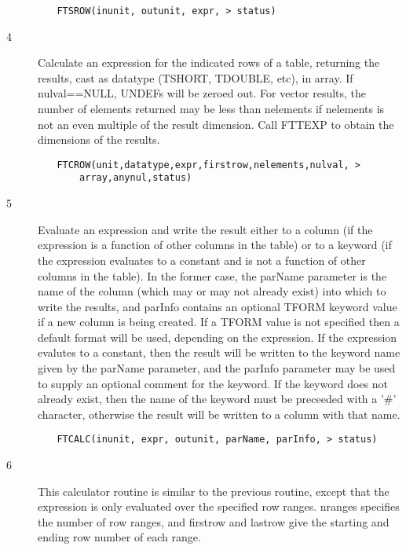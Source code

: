 \documentclass[11pt]{book}
\begin{document}
\begin{verbatim}
         FTSROW(inunit, outunit, expr, > status)
\end{verbatim}

\begin{description}
\item[4 ] Calculate an expression for the indicated rows of a table, returning
the results, cast as datatype (TSHORT, TDOUBLE, etc), in array.  If
nulval==NULL, UNDEFs will be zeroed out.  For vector results, the number
of elements returned may be less than nelements if nelements is not an
even multiple of the result dimension.  Call FTTEXP to obtain
the dimensions of the results.
\end{description}

\begin{verbatim}
         FTCROW(unit,datatype,expr,firstrow,nelements,nulval, >
             array,anynul,status)
\end{verbatim}

\begin{description}
\item[5 ]Evaluate an expression and write the result either to a column (if
the expression is a function of other columns in the table) or to a
keyword (if the expression evaluates to a constant and is not a
function of other columns in the table).  In the former case, the
parName parameter is the name of the column (which may or may not already
exist) into which to write the results, and parInfo contains an
optional TFORM keyword value if a new column is being created.  If a
TFORM value is not specified then a default format will be used,
depending on the expression.  If the expression evalutes to a constant,
then the result will be written to the keyword name given by the
parName parameter, and the parInfo parameter may be used to supply an
optional comment for the keyword.  If the keyword does not already
exist, then the name of the keyword must be preceeded with a '\#' character,
otherwise the result will be written to a column with that name.
\end{description}


\begin{verbatim}
         FTCALC(inunit, expr, outunit, parName, parInfo, > status)
\end{verbatim}

\begin{description}
\item[6 ] This calculator routine is similar to the previous routine, except
that the expression is only evaluated over the specified
row ranges.  nranges specifies the number of row ranges, and firstrow
and lastrow give the starting and ending row number of each range.
\end{description}
\end{document}
